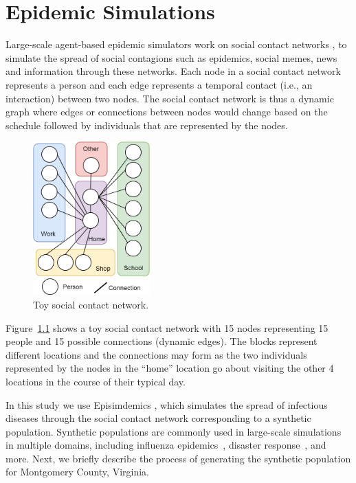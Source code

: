 \documentclass[doublespace,draft]{VTthesis}
\begin{document}
	\chapter{Epidemic Simulations} \label{ch:epi-simulations}
	Large-scale agent-based epidemic simulators work on social contact networks \cite{Glass2008}, to simulate the spread of social contagions such as epidemics, social memes, news and information through these networks. Each node in a social contact network represents a person and each edge represents a temporal contact (i.e., an interaction) between two nodes. The social contact network is thus a dynamic graph where edges or connections between nodes would change based on the schedule followed by individuals that are represented by the nodes. 
	\begin{figure}
    \centering
    \includegraphics[width=0.4\textwidth]{figures/scn.png}
    \caption{Toy social contact network.}
    \label{fig:scn}
    \end{figure}
	Figure~\ref{fig:scn} shows a toy social contact network with 15 nodes representing 15 people and 15 possible connections (dynamic edges). The blocks represent different locations and the connections may form as the two individuals represented by the nodes in the ``home'' location go about visiting the other 4 locations in the course of their typical day.
	
	In this study we use Episimdemics \cite{barrett2008episimdemics}, which simulates the spread of infectious diseases through the social contact network corresponding to a synthetic population. Synthetic populations are commonly used in large-scale simulations in multiple domains, including influenza epidemics~\cite{EG+04,parikh14cover}, disaster response~\cite{parikh13nps1}, and more. Next, we briefly describe the process of generating the synthetic population for Montgomery County, Virginia.  
    
\end{document}
